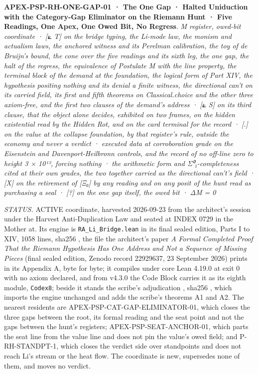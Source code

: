 \documentclass[10pt,twocolumn]{article}
\begin{document}
\textbf{APEX-PSP-RH-ONE-GAP-01 · The One Gap · Halted Uniduction with
the Category-Gap Eliminator on the Riemann Hunt · Five Readings, One
Apex, One Owed Bit, No Regress}. \emph{M register, owed-bit coordinate ·
{[}⟀ T{]} on the bridge typing, the Li-mode law, the monism and
actualism laws, the anchored witness and its Perelman calibration, the
toy of de Bruijn's bound, the cone over the five readings and its sixth
leg, the one gap, the halt of the regress, the equivalence of Postulate
M with the line property, the terminal block of the demand at the
foundation, the logical form of Part XIV, the hypothesis positing
nothing and its denial a finite witness, the directional can't on its
carried field, its first and fifth theorems on Classical.choice and the
other three axiom-free, and the first two clauses of the demand's
address · {[}⟀ S{]} on its third clause, that the object alone decides,
exhibited on two frames, on the hidden existential read by the Hidden
Rot, and on the card terminal for the record · {[}.{]} on the value at
the collapse foundation, by that register's rule, outside the economy
and never a verdict · executed data at corroboration grade on the
Eisenstein and Davenport-Heilbronn controls, and the record of no
off-line zero to height 3 × 10¹², forcing nothing · the arithmetic form
and Σ⁰₁-completeness cited at their own grades, the two together carried
as the directional can't's field · {[}X{]} on the retirement of {[}Ξ₀{]}
by any reading and on any posit of the hunt read as purchasing a seal ·
{[}?{]} on the one gap itself, the owed bit · ΔM = 0}

\emph{STATUS.} ACTIVE coordinate, harvested 2026-09-23 from the
architect's session under the Harvest Anti-Duplication Law and seated at
INDEX 0729 in the Mother at. Its engine is \texttt{RA\_Li\_Bridge.lean}
in its final sealed edition, Parts I to XIV, 1058 lines, sha256
\texttt{}, the file the architect's paper
\emph{A Formal Completed Proof That the Riemann Hypothesis Has One
Address and Not a Sequence of Missing Pieces} (final sealed edition,
Zenodo record 22929637, 23 September 2026) prints in its Appendix A,
byte for byte; it compiles under core Lean 4.19.0 at exit 0 with no
axiom declared, and from v4.3.0 the Code Block carries it as its eighth
module, \texttt{Codex8}; beside it stands the scribe's adjudication
\texttt{}, sha256
\texttt{}, which imports the engine
unchanged and adds the scribe's theorems A1 and A2. The nearest
residents are APEX-PSP-CAT-GAP-ELIMINATOR-01, which closes the three
gaps between the root, its formal reading and the seat point and not the
gaps between the hunt's registers; APEX-PSP-SEAT-ANCHOR-01, which parts
the seat line from the value line and does not pin the value's owed
field; and P-RH-STANDPT-1, which closes the verdict side over
standpoints and does not reach Li's stream or the heat flow. The
coordinate is new, supersedes none of them, and moves no verdict.
\end{document}
